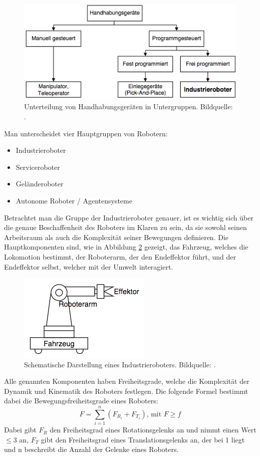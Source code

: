 \begin{figure}[H]
	\centering
	\includegraphics[width=.5\textwidth]{figuren/Handhabungsgeraete}
	\caption{Unterteilung von Handhabungsgeräten in Untergruppen. Bildquelle: \cite{pdf:roboticScript}.}
	\label{fig:Handhabungsgeräte}
\end{figure}
Man unterscheidet vier Hauptgruppen von Robotern:
\begin{itemize}
	\item Industrieroboter
	\item Serviceroboter
	\item Geländeroboter
	\item Autonome Roboter / Agentensysteme
\end{itemize}
Betrachtet man die Gruppe der Industrieroboter genauer, ist es wichtig sich über die genaue Beschaffenheit des Roboters im Klaren zu sein, da sie sowohl seinen Arbeitsraum als auch die Komplexität seiner Bewegungen definieren. Die Hauptkomponenten sind, wie in Abbildung \ref{fig:Roboter_Beschaffenheit} gezeigt, das Fahrzeug, welches die Lokomotion bestimmt, der Roboterarm, der den Endeffektor führt, und der Endeffektor selbst, welcher mit der Umwelt interagiert.
\begin{figure}[H]
	\centering
	\includegraphics[width=.5\textwidth]{figuren/Roboter_Beschaffenheit}
	\caption{Schematische Darstellung eines Industrieroboters. Bildquelle: \cite{pdf:roboticScript}.}
	\label{fig:Roboter_Beschaffenheit}
\end{figure}
Alle genannten Komponenten haben Freiheitsgrade, welche die Komplexität der Dynamik und Kinematik des Roboters festlegen. Die folgende Formel bestimmt dabei die Bewegungsfreiheitsgrade eines Roboters:
\begin{equation}
F=\sum_{i=1}^{n}(F_{R_{i}} + F_{T_{i}})\textrm{, mit }F \geq f
\end{equation}
Dabei gibt $F_{R}$ den Freiheitsgrad eines Rotationsgelenks an und nimmt einen Wert $\leq 3$ an, $F_{T}$ gibt den Freiheitsgrad eines Translationsgelenks an, der bei 1 liegt und n beschreibt die Anzahl der Gelenke eines Roboters.

